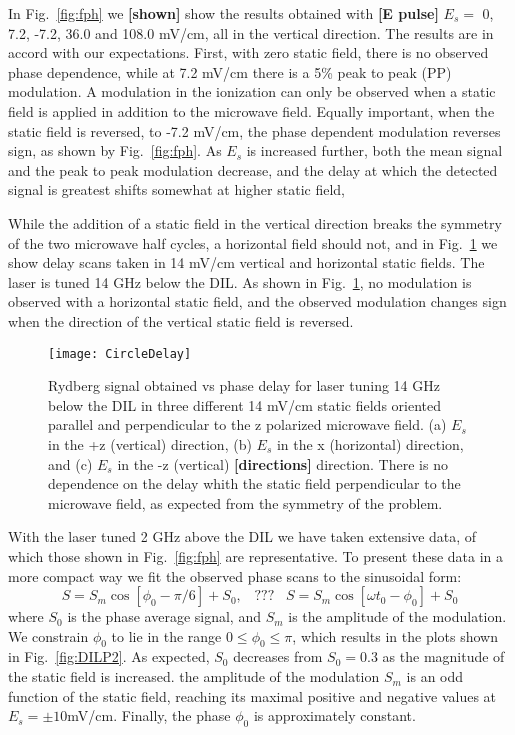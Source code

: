 \documentclass[aps,pra,preprint,groupedaddress]{revtex4-1}
\begin{document}
In Fig.~\ref{fig:fph} we \textbf{[shown]} show the results obtained with \textbf{[E pulse]} $E_{s}=$ 0, 7.2, -7.2, 36.0 and 108.0 mV/cm, all in the vertical direction. The results are in accord with our expectations. First, with zero static field, there is no observed phase dependence, while at 7.2 mV/cm there is a 5\% peak to peak (PP) modulation. A modulation in the ionization can only be observed when a static field is applied in addition to the microwave field. Equally important, when the static field is reversed, to -7.2 mV/cm, the phase dependent modulation reverses sign, as shown by Fig.~\ref{fig:fph}. As $E_s$ is increased further, both the mean signal and the peak to peak modulation decrease, and the delay at which the detected signal is greatest shifts somewhat at higher static field,


While the addition of a static field in the vertical direction breaks the symmetry of the two microwave half cycles, a horizontal field should not, and in Fig.~\ref{fig:CircleDelay} we show delay scans taken in 14 mV/cm vertical and horizontal static fields. The laser is tuned 14 GHz below the DIL. As shown in Fig.~\ref{fig:CircleDelay}, no modulation is observed with a horizontal static field, and the observed modulation changes sign when the direction of the vertical static field is reversed.


\begin{figure}
	\texttt{[image: CircleDelay]}
	\caption{Rydberg signal obtained vs phase delay for laser tuning 14 GHz below the DIL in three different 14 mV/cm static fields oriented parallel and perpendicular to the z polarized microwave field. (a) $E_s$ in the +z (vertical) direction, (b) $E_s$ in the x (horizontal) direction, and (c) $E_s$ in the -z (vertical) \textbf{[directions]} direction. There is no dependence on the delay whith the static field perpendicular to the microwave field, as expected from the symmetry of the problem. }
	\label{fig:CircleDelay}
\end{figure}


With the laser tuned 2 GHz above the DIL we have taken extensive data, of which those shown in Fig.~\ref{fig:fph} are representative. To present these data in a more compact way we fit the observed phase scans to the sinusoidal form:
\begin{equation} \label{eq:modfit}
S = S_m  \cos{[ \phi_0-\pi/6]} + S_0,
\hspace{10pt} \textbf{???} \hspace{10pt}
S = S_m \cos{[\omega t_0 - \phi_0]} + S_0
\end{equation}
where $S_0$ is the phase average signal, and $S_m$ is the amplitude of the modulation. We constrain $\phi_0$ to lie in the range $0\leq \phi_0\leq \pi$, which results in the plots shown in Fig.~\ref{fig:DILP2}. As expected, $S_0$ decreases from $S_0=0.3$  as the magnitude of the static field is increased. the amplitude of the modulation $S_m$ is an odd function of the static field, reaching its maximal positive and negative values at $E_s=\pm 10$mV/cm. Finally, the phase $\phi_0$ is approximately constant.
\end{document}
